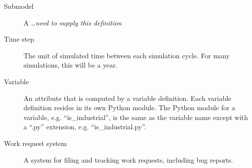 \begin{description}
\item[Submodel] 
A \ldots \emph{need to supply this definition}

\item[Time step] 
The unit of simulated time between each simulation cycle. For many
simulations, this will be a year.

\item[Variable]
An attribute that is computed by a variable definition.  Each
variable definition resides in its own Python module.  The 
Python module for a variable, e.g. ``is_industrial'', is the
same as the variable name except with a ``.py'' extension, 
e.g. ``is_industrial.py''.  

\item[Work request system] 
A system for filing and tracking work requests, including bug
reports.

\end{description}
